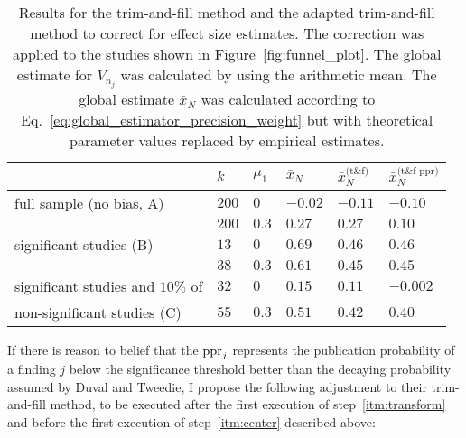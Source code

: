 \begin{table}[h!]
  \begin{center}
    \begin{tabular}{ >{\raggedright\let\\\tabularnewline}p{} | >{\raggedleft\let\\\tabularnewline}p{}| >{\raggedleft\let\\\tabularnewline}p{} | >{\raggedleft\let\\\tabularnewline}p{} | >{\raggedleft\let\\\tabularnewline}p{} | >{\raggedleft\let\\\tabularnewline}p{}} 
    \hline
     & $k$\TBstrut & $\mu_1$ & $\bar{x}_N$ & $\bar{x}_N^{\text{(t\&f)}}$ & $\bar{x}_N^{\text{(t\&f-ppr)}}$\\ 
    \hline
    full sample (no bias, A)\Tstrut & $200$ & $0$ & $-0.02$ & $-0.11$ & $-0.10$ \\ 
    & $200$\Bstrut & $0.3$ & $0.27$ & $0.27$ & $0.10$\\
    \hline
    significant studies (B)\Tstrut& $13$ & $0$ & $0.69$ & $0.46$ & $0.46$ \\
    & $38$\Bstrut & $0.3$ & $0.61$ & $0.45$ & $0.45$ \\
    \hline
    significant studies and $10\%$ of\Tstrut & $32$ & $0$ & $0.15$ & $0.11$ & $-0.002$ \\
    non-significant studies (C) & $55$\Bstrut & $0.3$ & $0.51$ & $0.42$ & $0.40$\\
 \hline
\end{tabular}
    \caption[The trim-and-fill method to correct effect size estimates.]{Results for the trim-and-fill method and the adapted trim-and-fill method to correct for effect size estimates. The correction was applied to the studies shown in Figure~\ref{fig:funnel_plot}. The global estimate for $V_{n_j}$ was calculated by using the arithmetic mean. The global estimate $\bar{x}_N$ was calculated according to Eq.~\ref{eq:global_estimator_precision_weight} but with theoretical parameter values replaced by empirical estimates.}
    \label{tab:trim_and_fill}
  \end{center}
\end{table}
If there is reason to belief that the $\operatorname{\text{ppr}}_j$ represents the publication probability of a finding $j$ below the significance threshold better than the decaying probability assumed by Duval and Tweedie, I propose the following adjustment to their trim-and-fill method, to be executed after the first execution of step~\ref{itm:transform} and before the first execution of step~\ref{itm:center} described above:
